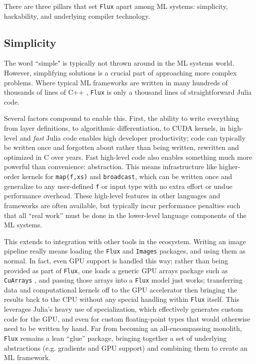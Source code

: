 \documentclass{juliacon}
\begin{document}
There are three pillars that set \texttt{Flux} apart among ML systems: simplicity, hackability, and underlying compiler technology.


\subsection{Simplicity}
%

The word ``simple" is typically not thrown around in the ML systems world. However, simplifying solutions is a crucial part of approaching more complex problems. Where typical ML frameworks are written in many hundreds of thousands of lines of C++ \cite{abadi2016tensorflow}, \texttt{Flux} is only a thousand lines of straightforward Julia code.

Several factors compound to enable this. First, the ability to write everything from layer definitions, to algorithmic differentiation, to CUDA kernels, in high-level and \textit{fast} Julia code enables high developer productivity; code can typically be written once and forgotten about rather than being written, rewritten and optimized in C over years. Fast high-level code also enables something much more powerful than convenience: abstraction. This means infrastructure like higher-order kernels for \texttt{map(f,xs)} and \texttt{broadcast}, which can be written once and generalize to any user-defined \texttt{f} or input type with no extra effort or undue performance overhead.  These high-level features in other languages and frameworks are often available, but typically incur performance penalties such that all ``real work'' must be done in the lower-level language components of the ML systems.

This extends to integration with other tools in the ecosystem.  Writing an image pipeline really means loading the \texttt{Flux} and \texttt{Images} \cite{Images.jl} packages, and using them as normal. In fact, even GPU support is handled this way; rather than being provided as part of \texttt{Flux}, one loads a generic GPU arrays package such as \texttt{CuArrays} \cite{CuArrays.jl}, and passing those arrays into a \texttt{Flux} model just works; transferring data and computational kernels off to the GPU accelerator then bringing the results back to the CPU without any special handling within \texttt{Flux} itself. This leverages Julia's heavy use of specialization, which effectively generates custom code for the GPU, and even for custom floating-point types that would otherwise need to be written by hand.  Far from becoming an all-encompassing monolith, \texttt{Flux} remains a lean ``glue'' package, bringing together a set of underlying abstractions (e.g. gradients and GPU support) and combining them to create an ML framework.
\end{document}
